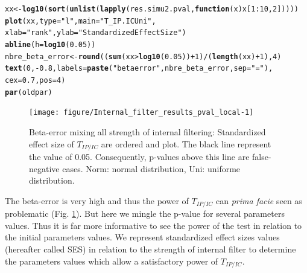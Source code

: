\documentclass[12pt]{article}\usepackage[]{graphicx}\usepackage[]{color}
\makeatletter
\newcommand{\hlnum}[1]{\textcolor[rgb]{0.686,0.059,0.569}{#1}}%
\newcommand{\hlstr}[1]{\textcolor[rgb]{0.192,0.494,0.8}{#1}}%
\newcommand{\hlopt}[1]{\textcolor[rgb]{0,0,0}{#1}}%
\newcommand{\hlstd}[1]{\textcolor[rgb]{0.345,0.345,0.345}{#1}}%
\newcommand{\hlkwa}[1]{\textcolor[rgb]{0.161,0.373,0.58}{\textbf{#1}}}%
\newcommand{\hlkwb}[1]{\textcolor[rgb]{0.69,0.353,0.396}{#1}}%
\newcommand{\hlkwc}[1]{\textcolor[rgb]{0.333,0.667,0.333}{#1}}%
\newcommand{\hlkwd}[1]{\textcolor[rgb]{0.737,0.353,0.396}{\textbf{#1}}}%
\newenvironment{kframe}{%
 \def\at@end@of@kframe{}%
 \ifinner\ifhmode%
  \def\at@end@of@kframe{\end{minipage}}%
  \begin{minipage}{\columnwidth}%
 \fi\fi%
 \def\FrameCommand##1{\hskip\@totalleftmargin \hskip-\fboxsep
 \colorbox{shadecolor}{##1}\hskip-\fboxsep
     \hskip-\linewidth \hskip-\@totalleftmargin \hskip\columnwidth}%
 \MakeFramed {\advance\hsize-\width
   \@totalleftmargin\z@ \linewidth\hsize
   \@setminipage}}%
 {\par\unskip\endMakeFramed%
 \at@end@of@kframe}
\newenvironment{knitrout}{}{} %
\makeatother
\begin{document}
\begin{knitrout}
\begin{kframe}
\begin{alltt}
\hlstd{xx} \hlkwb{<-} \hlkwd{log10}\hlstd{(}\hlkwd{sort}\hlstd{(}\hlkwd{unlist}\hlstd{(}\hlkwd{lapply}\hlstd{(res.simu2.pval,} \hlkwa{function}\hlstd{(}\hlkwc{x}\hlstd{) x[}\hlnum{1}\hlopt{:}\hlnum{10}\hlstd{,} \hlnum{2}\hlstd{]))))}
\hlkwd{plot}\hlstd{(xx,} \hlkwc{type} \hlstd{=} \hlstr{"l"}\hlstd{,} \hlkwc{main} \hlstd{=} \hlstr{"T_IP.IC Uni"}\hlstd{,}
     \hlkwc{xlab} \hlstd{=} \hlstr{"rank"}\hlstd{,} \hlkwc{ylab} \hlstd{=} \hlstr{"Standardized Effect Size"}\hlstd{)}
\hlkwd{abline}\hlstd{(}\hlkwc{h} \hlstd{=} \hlkwd{log10}\hlstd{(}\hlnum{0.05}\hlstd{))}
\hlstd{nbre_beta_error} \hlkwb{<-} \hlkwd{round}\hlstd{((}\hlkwd{sum}\hlstd{(xx}\hlopt{>}\hlkwd{log10}\hlstd{(}\hlnum{0.05}\hlstd{))}\hlopt{+}\hlnum{1}\hlstd{)}\hlopt{/}\hlstd{(}\hlkwd{length}\hlstd{(xx)}\hlopt{+}\hlnum{1}\hlstd{),} \hlnum{4}\hlstd{)}
\hlkwd{text}\hlstd{(}\hlnum{0}\hlstd{,} \hlopt{-}\hlnum{0.8}\hlstd{,} \hlkwc{labels} \hlstd{=} \hlkwd{paste}\hlstd{(}\hlstr{"beta error"}\hlstd{, nbre_beta_error,} \hlkwc{sep} \hlstd{=} \hlstr{" = "}\hlstd{),}
  \hlkwc{cex} \hlstd{=} \hlnum{0.7}\hlstd{,} \hlkwc{pos} \hlstd{=} \hlnum{4}\hlstd{)}
\hlkwd{par}\hlstd{(oldpar)}
\end{alltt}
\end{kframe}\begin{figure}

{\centering \texttt{[image: figure/Internal\_filter\_results\_pval\_local-1]} 

}

\caption[Beta-error mixing all strength of internal filtering]{Beta-error mixing all strength of internal filtering: Standardized effect size of $T_{IP/IC}$ are ordered and plot. The black line represent the value of 0.05. Consequently, p-values above this line are false-negative cases. Norm: normal distribution, Uni: uniforme distribution. \label{fig:Internal_filter_results_pval_local}}
\end{figure}


\end{knitrout}

The beta-error is very high and thus the power of $T_{IP/IC}$ can \textit{prima facie} seen as problematic (Fig. \ref{fig:Internal_filter_results_pval_local}). But here we mingle the p-value for several parameters values. Thus it is far more informative to see the power of the test in relation to the initial parameters values. We represent standardized effect sizes values (hereafter called SES) in relation to the strength of internal filter to determine the parameters values which allow a satisfactory power of $T_{IP/IC}$.
\end{document}

